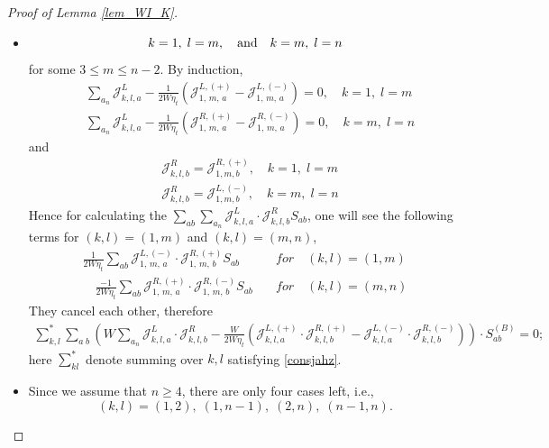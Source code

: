 \documentclass[10pt,a4paper]{amsart}
\newcommand{\cal}{\mathcal}
\begin{document}
\begin{proof}[Proof of Lemma \ref{lem_WI_K}]
\begin{itemize}
\item 
\begin{equation}\label{consjahz}
    k=1,\; l=m,  \quad \hbox{and}\quad   k=m, \;  l=n
\end{equation} 
for some $3\le m\le n-2 $. By induction, 
\begin{align}\label{awslw22}
    &\sum_{a_n}{\cal J}^{L}_{k,l,a}-\frac{1}{2W\eta_t}\left({\cal J}^{L,(+)}_{1,\,m,\,a} -{\cal J}^{L,(-)}_{1,\,m,\,a} \right)=0,\quad  k=1, \; l=m
    \\\nonumber
    &\sum_{a_n}{\cal J}^{L}_{k,l,a}-\frac{1}{2W\eta_t}\left({\cal J}^{R,(+)}_{1,\,m,\,a} -{\cal J}^{R,(-)}_{1,\,m,\,a} \right)=0,\quad  k=m, \; l=n
\end{align} 
and 
\begin{align}\label{awslw33}
    &{\cal J}^R_{k,l,b}={\cal J}^{R,(+)}_{1,m,b},\quad  k=1, \; l=m
    \\\nonumber
    &{\cal J}^R_{k,l,b}={\cal J}^{L,(-)}_{1,m,b},\quad  k=m, \; l=n
\end{align}
Hence  for calculating the  $\sum_{ab}\sum_{a_n} 
        {\cal J}^{L}_{k,l,a}\cdot{\cal J}^{R}_{k,l,b}S_{ab}$, one will see the following terms for $(k,l)=(1,m)$ and $(k,l)=(m,n)$, 
  \begin{align}\nonumber
   \frac{1}{2W\eta_t}   \sum_{ab}  {\cal J}^{L,(-)}_{1,\,m,\,a}\cdot {\cal J}^{R,(+)}_{1,\,m,\,b} S_{ab}\quad  & for \quad (k,l)=(1,m)\\\nonumber
\quad  \frac{-1}{2W\eta_t} \sum_{ab}  {\cal J}^{R,(+)}_{1,\,m,\,a}\cdot {\cal J}^{R,(-)}_{1,\,m,\,b} S_{ab}\quad &  for \quad (k,l)=( m,n)
  \end{align}
   They  cancel each other,  therefore %
 \begin{align}\label{uisiip}
    \sum_{k,l}^*  \sum_{a\;b}
    \left( {W}\sum_{a_n} 
        {\cal J}^{L}_{k,l,a}\cdot{\cal J}^{R}_{k,l,b}
        -\frac{W}{2W\eta_t} 
        \left(
        {\cal J}^{L,(+)}_{k,l,a}\cdot{\cal J}^{R,(+)}_{k,l,b}
        -
        {\cal J}^{L,(-)}_{k,l,a}\cdot{\cal J}^{R,(-)}_{k,l,b}
        \right)
        \right)\cdot S^{(B)}_{ab} =0; 
 \end{align}
 here  $\sum_{kl}^*$ denote   summing  over  $k,l$ satisfying  \eqref{consjahz}.  

 \item Since we assume that  $n\ge 4$, there are only four cases left, i.e., 
 \begin{equation}\label{keayew}
  (k,l)=(1,2), \; (1,n-1), \;(2,n), \;(n-1, n).
 \end{equation}
 

\end{itemize}
\end{proof}
\end{document}
